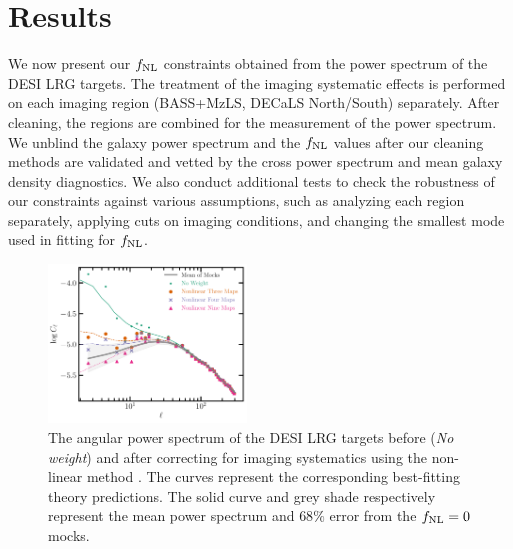 \section{Results}\label{sec:results}
We now present our $f_{\rm NL}$ constraints obtained from the power spectrum of the DESI LRG targets. The treatment of the imaging systematic effects is performed on each imaging region (BASS+MzLS, DECaLS North/South) separately. After cleaning, the regions are combined for the measurement of the power spectrum. We unblind the galaxy power spectrum and the $f_{\rm NL}$ values after our cleaning methods are validated and vetted by the cross power spectrum and mean galaxy density diagnostics. We also conduct additional tests to check the robustness of our constraints against various assumptions, such as analyzing each region separately, applying cuts on imaging conditions, and changing the smallest mode used in fitting for $f_{\rm NL}$.


\begin{figure}
    \centering
    \includegraphics[width=0.47\textwidth]{figures/model_dr9.pdf} 
    \caption{The angular power spectrum of the DESI LRG targets before (\textit{No weight}) and after correcting for imaging systematics using the  non-linear method . The curves represent the corresponding best-fitting theory predictions. The solid curve and grey shade respectively represent the mean power spectrum and $68\%$ error from the $f_{\rm NL}=0$ mocks. }
    \label{fig:cl_dr9}
\end{figure}


